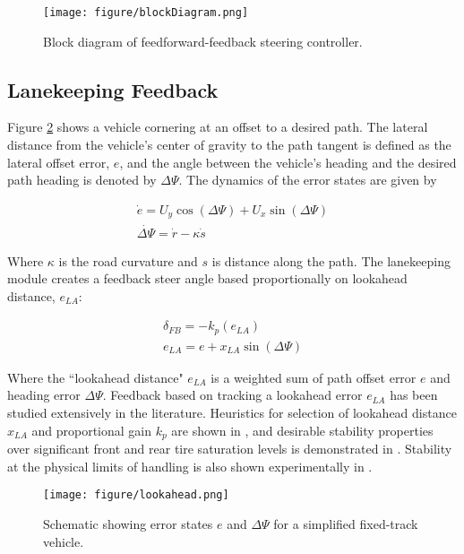 \documentclass[twocolumn,10pt]{asme2e}
\begin{document}
\begin{figure}
\centering
\texttt{[image: figure/blockDiagram.png]}
\caption{Block diagram of feedforward-feedback steering controller.}
\label{fig:blockDiagram}
\end{figure}

\subsection{Lanekeeping Feedback}
Figure \ref{fig:lookahead} shows a vehicle cornering at an offset to a desired path. The lateral distance from the vehicle's center of gravity to the path tangent is defined as the lateral offset error, $e$, and the angle between the vehicle's heading and the
desired path heading is denoted by $\Delta\Psi$. The dynamics of the error states are given by

\begin{equation}
\begin{aligned}
\dot{e} = U_y\cos(\Delta\Psi)+U_x\sin(\Delta\Psi)\\
\dot{\Delta\Psi} = \dot{r} - \kappa\dot{s}
\end{aligned}
\label{eqn:errordynamics}
\end{equation}

Where $\kappa$ is the road curvature and $s$ is distance along the path. The lanekeeping module creates a feedback steer angle based proportionally on lookahead distance, $e_{LA}$:

\begin{equation}
\begin{aligned}
\delta_{FB} = -k_p(e_{LA} )\\
e_{LA} = e+x_{LA}\sin(\Delta\Psi)
\label{eqn:fbeqn}
\end{aligned}
\end{equation}

Where the ``lookahead distance" $e_{LA}$ is a weighted sum of path offset error $e$ and heading error $\Delta\Psi$.
Feedback based on tracking a lookahead error $e_{LA}$ has been studied extensively in the literature. Heuristics for selection of lookahead distance $x_{LA}$ and proportional gain $k_p$ 
are shown in \cite{rosseter}, and  desirable stability
properties over significant front and rear tire saturation levels is demonstrated in \cite{talvala}. Stability at the physical limits of handling is also shown experimentally in \cite{mickthesis}.


\begin{figure}
\centering
\texttt{[image: figure/lookahead.png]}
\caption{Schematic showing error states $e$ and $\Delta\Psi$ for a simplified fixed-track vehicle.}
\label{fig:lookahead}
\end{figure}
\end{document}
